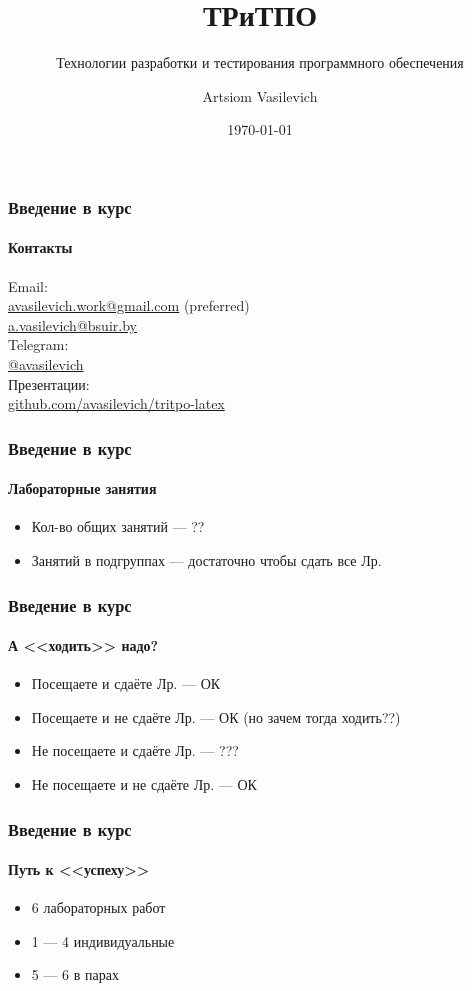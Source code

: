 \documentclass[aspectratio=169, 12pt]{beamer}
\title{ТРиТПО}
\subtitle{Технологии разработки и тестирования программного обеспечения}
\author{Artsiom Vasilevich}
\institute[BSUIR]{Belarusian State University of Informatics and Radioelectronics}
\date{\tiny \today}
\begin{document}
\frame{\titlepage}

\begin{frame}[t]
    \frametitle{Введение в курс}
    \framesubtitle{Контакты}
    Email: \\
    \hspace{0.5cm} \href{mailto:avasilevich.work@gmail.com}{avasilevich.work@gmail.com} (preferred) \\
    \hspace{0.5cm} \href{mailto:a.vasilevich@bsuir.by}{a.vasilevich@bsuir.by} \\
    \vspace{\baselineskip}
    Telegram: \\
    \hspace{0.5cm} \href{https://t.me/avasilevich}{@avasilevich} \\
    \vspace{\baselineskip}
    Презентации: \\
    \hspace{0.5cm} \href{https://github.com/avasilevich/tritpo-latex}{github.com/avasilevich/tritpo-latex} \\
\end{frame}

\begin{frame}
    \frametitle{Введение в курс}
    \framesubtitle{Лабораторные занятия}
    \begin{itemize}
        \item Кол-во общих занятий --- ??
        \item Занятий в подгруппах --- достаточно чтобы сдать все Лр.
    \end{itemize}
\end{frame}

\begin{frame}
    \frametitle{Введение в курс}
    \framesubtitle{А <<ходить>> надо?} \pause
    \begin{itemize}
        \item Посещаете и сдаёте Лр. --- ОК \pause
        \item Посещаете и не сдаёте Лр. --- ОК (но зачем тогда ходить??) \pause
        \item Не посещаете и сдаёте Лр. --- ??? \pause
        \item Не посещаете и не сдаёте Лр. --- ОК
    \end{itemize}
\end{frame}

\begin{frame}
    \frametitle{Введение в курс}
    \framesubtitle{Путь к <<успеху>>}
    \begin{itemize}
        \item 6 лабораторных работ
        \item 1 --- 4 индивидуальные
        \item 5 --- 6 в парах
    \end{itemize}
\end{frame}
\end{document}
